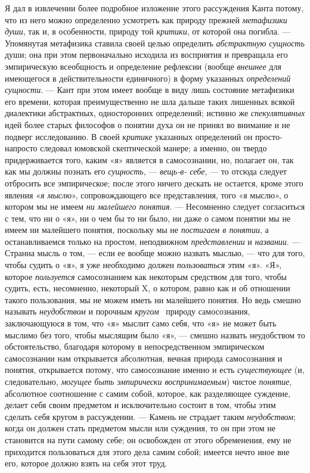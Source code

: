 \documentclass[twoside]{article}
\begin{document}
{Я дал в извлечении более подробное изложение этого рассуждения
Канта потому, что из него можно определенно усмотреть как природу прежней
{\em метафизики души},
так и, в особенности, природу той
{\em критики}, от которой
она погибла. — Упомянутая метафизика ставила своей целью
определить {\em абстрактную сущность}
души; она при этом первоначально исходила из восприятия и
превращала его эмпирическую всеобщность и определение рефлексии (вообще
{\em внешнее} для
имеющегося в действительности единичного) в форму указанных
{\em определений сущности}. —
Кант при этом имеет вообще в виду лишь состояние метафизики
его времени, которая преимущественно не шла дальше таких лишенных всякой
диалектики абстрактных, односторонних определений; истинно же
{\em спекулятивных} идей
более старых философов о понятии духа он не принял во внимание и не подверг
исследованию. В своей {\em критике}
указанных определений он просто-напросто следовал юмовской
скептической манере; а именно, он твердо придерживается того, каким «я»
является в самосознании, но, полагает он, так как мы должны познать его
{\em сущность}, —
{\em вещь-в- себе}, — то
отсюда следует отбросить все эмпирическое; после этого ничего дескать не
остается, кроме этого явления
«{\em я мыслю}»,
сопровождающего все представления, того «я мыслю», о котором
мы не имеем {\em ни малейшего понятия}.
— Несомненно следует согласиться с тем, что ни о «я», ни о
чем бы то ни было, ни даже о самом понятии мы не имеем ни малейшего
понятия, поскольку мы не {\em постигаем
в понятии}, а останавливаемся только на простом, неподвижном
{\em представлении} и
{\em названии}. — Странна
мысль о том, — если ее вообще можно назвать мыслью, —
что для того, чтобы судить о «я», я уже необходимо должен
{\em пользоваться} этим
«я». «Я», которое {\em пользуется}
самосознанием как некоторым средством для того, чтобы судить,
есть, несомненно, некоторый X, о котором, равно как и об отношении такого
пользования, мы не можем иметь ни малейшего понятия. Но ведь смешно
называть {\em неудобством}
и порочным
{\em кругом}~\label{bkm:bm97}
природу самосознания, заключающуюся в том, что «я» мыслит
само себя, что «я» не может быть мыслимо без того, чтобы мыслящим было
«я», — смешно назвать неудобством то обстоятельство,
благодаря которому в непосредственном эмпирическом
самосознании нам открывается абсолютная, вечная природа самосознания и
понятия, открывается потому, что самосознание именно и есть
{\em существующее} (и,
следовательно, {\em могущее быть
эмпирически воспринимаемым}) чистое
{\em понятие}, абсолютное
соотношение с самим собой, которое, как разделяющее суждение, делает себя
своим предметом и исключительно состоит в том, чтобы этим сделать себя
кругом в рассуждении. — Камень не страдает таким
{\em неудобством}; когда
он должен стать предметом мысли или суждения, то он при этом не становится
на пути самому себе; он освобожден от этого обременения, ему не приходится
пользоваться для этого дела самим собой; имеется нечто иное вне его,
которое должно взять на себя этот труд.

}
\end{document}
